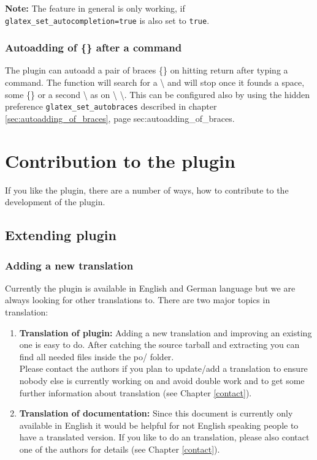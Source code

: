 \documentclass[%
paper=a4,%
fontsize=11pt,%
twoside=false,%
DIV18,%
headsepline,%
plainheadsepline,%
footsepline,%
plainfootsepline,%
bibliography=totoc,%
listof=totoc,%
BCOR10mm,%
parskip=half,%
openany,%
]{scrartcl}
\begin{document}
\textbf{Note:} The feature in general is only working, if
\texttt{glatex\_set\_autocompletion=true} is also set to \texttt{true}.

\subsubsection{Autoadding of \{\} after a command}

The plugin can autoadd a pair of braces \{\} on hitting return after typing a
command. The function will search for a \textbackslash{} and will
stop once it founds a space, some \{\} or a second \textbackslash{}
as on \textbackslash{} \textbackslash{}. This can be configured also
by using the hidden preference \texttt{glatex\_set\_autobraces}
described in chapter \ref{sec:autoadding_of_braces}, page \pageref
{sec:autoadding_of_braces}.


\section{Contribution to the plugin}
If you like the plugin, there are a number of ways, how to
contribute to the development of the plugin.

\subsection{Extending plugin}

\subsubsection{Adding a new translation}
\label{sec:translating}
Currently the plugin is available in English and German language but
we are always looking for other translations to. There are two major
topics in translation:

\begin{enumerate}
\item \textbf{Translation of plugin:}
	   Adding a new translation and improving an existing one is easy to
	   do. After catching the source tarball and extracting you can find
	   all needed files inside the po/ folder. \\
	   Please contact the authors if you plan to update/add a translation
	   to ensure nobody else is currently working on and avoid double
	   work and to get some further information about translation (see
	   Chapter \ref{contact}).
\item \textbf{Translation of documentation:}
	   Since this document is currently only available in English it
	   would be helpful for not English speaking people to have a
	   translated version. If you like to do an translation, please
	   also contact one of the authors for details (see Chapter \ref{contact}).
\end{enumerate}
\end{document}
